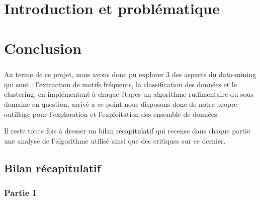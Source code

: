 \documentclass[12pt]{report}
\begin{document}
 
\tableofcontents

\newpage


\chapter{Introduction et problématique}




\newpage

\newpage

\newpage

\chapter{Conclusion}
	\paragraph{}
	Au terme de ce projet, nous avons donc pu explorer 3 des aspects du data-mining qui sont : l'extraction de motifs fréquents, la classification des données et le clustering. en implémentant à chaque étapes un algorithme rudimentaire du sous domaine en question, arrivé a ce point nous disposons donc de notre propre outillage pour l'exploration et l'exploitation des ensemble de données.
	\par 
	Il reste toute fois à dresser un bilan récapitulatif qui recense dans chaque partie une analyse de l'algorithme utilisé ainsi que des critiques sur ce dernier.
	\section{Bilan récapitulatif}
		\subsection{Partie I}
\end{document}
